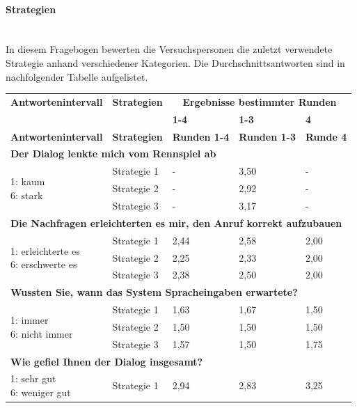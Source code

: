 \documentclass[12pt,a4paper]{scrartcl}
\begin{document}
\paragraph{Strategien}
~\\
In diesem Fragebogen bewerten die Versuchspersonen die zuletzt verwendete Strategie anhand verschiedener Kategorien. Die Durchschnittsantworten sind in nachfolgender Tabelle aufgelistet. 
\newpage
\begin{longtable}{|p{4cm}|p{2cm}|p{2cm}|p{2cm}|p{2cm}|}
	\hline
		\textbf{Antwortenintervall}&\textbf{Strategien}&\multicolumn{3}{c|}{\textbf{Ergebnisse bestimmter Runden}}\\
	&&\textbf{1-4}&\textbf{1-3} &\textbf{4}\\
	\hline
	\endfirsthead
	\hline
	\textbf{Antwortenintervall}&\textbf{Strategien}&\textbf{Runden 1-4}&\textbf{Runden 1-3} &\textbf{Runde 4}\\
	\hline
	\endhead
		\multicolumn{5}{l}{\textbf{Der Dialog lenkte mich vom Rennspiel ab}}\\
		\hline
\multirow{3}{4cm}{1: kaum \newline 6: stark} & Strategie 1 & - & 3,50  & - \\
  & Strategie 2 & - & 2,92 & -\\
  & Strategie 3 & - & 3,17 & -\\
\hline
		\multicolumn{5}{l}{\textbf{Die Nachfragen erleichterten es mir, den Anruf korrekt aufzubauen}}\\
		\hline
\multirow{3}{4cm}{1: erleichterte es\newline  6: erschwerte es} & Strategie 1 & 2,44 & 2,58 & 2,00 \\
 & Strategie 2 & 2,25 & 2,33 & 2,00 \\
 & Strategie 3 & 2,38 & 2,50 & 2,00 \\
\hline
		\multicolumn{5}{l}{\textbf{Wussten Sie, wann das System Spracheingaben erwartete?}}\\
		\hline
\multirow{3}{4cm}{1: immer \newline  6: nicht immer} & Strategie 1 & 1,63 & 1,67 & 1,50 \\
 & Strategie 2 & 1,50 & 1,50 & 1,50 \\
 & Strategie 3 & 1,57 & 1,50 & 1,75 \\
\hline
		\multicolumn{5}{l}{\textbf{Wie gefiel Ihnen der Dialog insgesamt?}}\\
		\hline
\multirow{3}{4cm}{1: sehr gut \newline  6: weniger gut} & Strategie 1 & 2,94 & 2,83 & 3,25 \\

\end{longtable}
\end{document}
